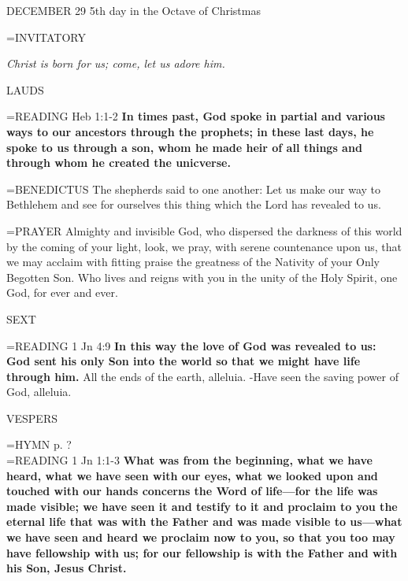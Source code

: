 DECEMBER 29
5th day in the Octave of Christmas

\hangindent=\parindent \small{INVITATORY	}
\begin{center}
\textit{Christ is born for us; come, let us adore him.\\}
\end{center}

\begin{flushleft}\normalsize LAUDS\\\end{flushleft}
\hangindent=\parindent \small{READING}    Heb 1:1-2 \textbf{   In times past, God spoke in partial and various ways to our ancestors through the prophets; in these last days, he spoke to us through a son, whom he made heir of all things and through whom he created the unicverse.\\}

\hangindent=\parindent \small{BENEDICTUS 	The shepherds said to one another: Let us make our way to Bethlehem and see for ourselves this thing which the Lord has revealed to us.\\}

\hangindent=\parindent \small{PRAYER 	Almighty and invisible God, who dispersed the darkness of this world by the coming of your light, look, we pray, with serene countenance upon us, that we may acclaim with fitting praise the greatness of the Nativity of your Only Begotten Son. Who lives and reigns with you in the unity of the Holy Spirit, one God, for ever and ever.}

\begin{flushleft}\normalsize SEXT\\\end{flushleft}
\hangindent=\parindent \small{READING}    1 Jn 4:9 \textbf{    In this way the love of God was revealed to us: God sent his only Son into the world so that we might have life through him.}
All the ends of the earth, alleluia.
-Have seen the saving power of God, alleluia.

\begin{flushleft}\normalsize VESPERS\\\end{flushleft}
\hangindent=\parindent \small{\uppercase{HYMN} p.  ?\\}
\hangindent=\parindent \small{READING}    1 Jn 1:1-3 \textbf{   What was from the beginning, what we have heard, what we have seen with our eyes, what we looked upon and touched with our hands concerns the Word of life—for the life was made visible; we have seen it and testify to it and proclaim to you the eternal life that was with the Father and was made visible to us—what we have seen and heard we proclaim now to you, so that you too may have fellowship with us; for our fellowship is with the Father and with his Son, Jesus Christ.\\}

